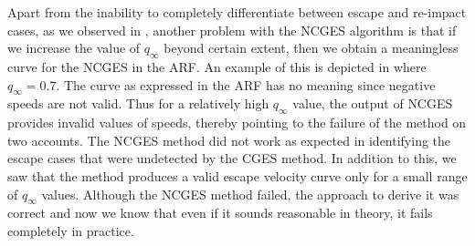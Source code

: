 %
Apart from the inability to completely differentiate between escape and re-impact cases, as we observed in , another problem with the \gls{NCGES} algorithm is that if we increase the value of $q_\infty$ beyond certain extent, then we obtain a meaningless curve for the \gls{NCGES} in the \gls{ARF}. An example of this is depicted in  where $q_\infty = 0.7$. The curve as expressed in the \gls{ARF} has no meaning since negative speeds are not valid. Thus for a relatively high $q_\infty$ value, the output of \gls{NCGES} provides invalid values of speeds, thereby pointing to the failure of the method on two accounts.
%
\newline\newline
%
The \gls{NCGES} method did not work as expected in identifying the escape cases that were undetected by the \gls{CGES} method. In addition to this, we saw that the method produces a valid escape velocity curve only for a small range of $q_\infty$ values. Although the \gls{NCGES} method failed, the approach to derive it was correct and now we know that even if it sounds reasonable in theory, it fails completely in practice.

